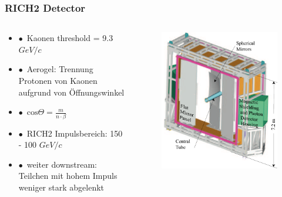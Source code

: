 \documentclass[aspectratio=1610, 12pt, xcolor=dvipsnames]{beamer}
\begin{document}
\begin{frame}\frametitle{RICH2 Detector}
  \begin{columns}
    \begin{column}[c]{0.48\textwidth}
      \begin{itemize}
	      \item $\bullet$\, Kaonen threshold = 9.3 $GeV/c$
        \item $\bullet$\, Aerogel: Trennung Protonen von Kaonen aufgrund von Öffnungswinkel
        \item $\bullet$\, $\text{cos}\Theta = \frac{m}{n\cdot\beta}$
        \item $\bullet$\, RICH2 Impulsbereich: 150 - 100 $GeV/c$
        \item $\bullet$\, weiter downstream: Teilchen mit hohem Impuls weniger stark abgelenkt
      \end{itemize}
    \end{column}
    \begin{column}[c]{0.48\textwidth}
      \begin{figure}
	       \centering
	       \includegraphics[width=\textwidth]{plots/rich2.png}
      \end{figure}
    \end{column}
  \end{columns}
\end{frame}
\end{document}
